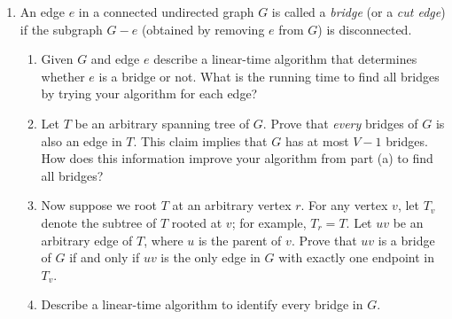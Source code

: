 \begin{exercises}
\begin{enumerate}[label=\arabic*.,ref=\thechapter.\arabic*,leftmargin=*,align=left,itemsep=1.5ex plus 0.5ex,start=0]
\begin{enumerate}
\item Describe a linear-time algorithm that determines, given an undirected graph $G$ and a vertex $v$, whether $v$ is a cut vertex in $G$.
What is the running time to find all cut vertices by trying your algorithm for each vertex?
\item Let $T$ be a depth-first spanning tree of an undirected graph $G$.
\begin{enumerate}[label=\roman*.]
\item Prove that the root of $T$ is a cut vertex of $G$ if and only if it has more than one child in $T$.
\item Prove that a non-root vertex $v$ is a cut vertex of $G$ if and only if at least one descendant (in $T$) of each child of $v$ (in $T$) is a neighbor (in $G$) of some proper ancestor of $v$ (in $T$).
\end{enumerate}
\item Describe an algorithm that identifies every cut vertex in a given undirected graph in $O(V+E)$ time.
\end{enumerate}

\item An edge $e$ in a connected undirected graph $G$ is called a \textit{bridge} (or a \textit{cut edge}) if the subgraph $G - e$ (obtained by removing $e$ from $G$) is disconnected.
\begin{enumerate}
\item Given $G$ and edge $e$ describe a linear-time algorithm that determines whether $e$ is a bridge or not.
What is the running time to find all bridges by trying your algorithm for each edge?
\item Let $T$ be an arbitrary spanning tree of $G$.
Prove that \textit{every} bridges of $G$ is also an edge in $T$.
This claim implies that $G$ has at most $V-1$ bridges.
How does this information improve your algorithm from part (a) to find all bridges?
\item Now suppose we root $T$ at an arbitrary vertex $r$.
For any vertex $v$, let $T_v$ denote the subtree of $T$ rooted at $v$; for example, $T_r = T$.
Let $uv$ be an arbitrary edge of $T$, where $u$ is the parent of $v$.
Prove that $uv$ is a bridge of $G$ if and only if $uv$ is the only edge in $G$ with exactly one endpoint in $T_v$.
\item Describe a linear-time algorithm to identify every bridge in $G$.
\end{enumerate}


\end{enumerate}
\end{exercises}
